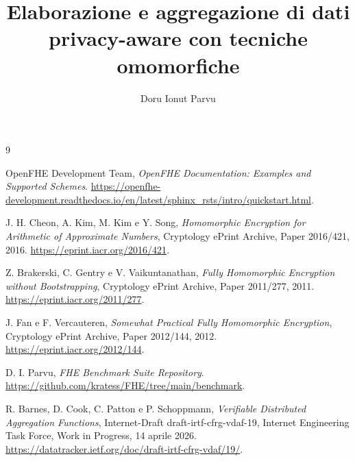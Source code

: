 \documentclass[12pt,a4paper]{report}
\title{Elaborazione e aggregazione di dati privacy-aware con tecniche omomorfiche}
\author{Doru Ionut Parvu}
\date{}
\begin{document}
\pagestyle{plain}
\justifying
\hypersetup{pageanchor=false}

\clearpage
\hypersetup{pageanchor=true}
\tableofcontents
\clearpage
{}








\begin{thebibliography}{9}

OpenFHE Development Team,
\emph{OpenFHE Documentation: Examples and Supported Schemes}.
\url{https://openfhe-development.readthedocs.io/en/latest/sphinx_rsts/intro/quickstart.html}.

J. H. Cheon, A. Kim, M. Kim e Y. Song,
\emph{Homomorphic Encryption for Arithmetic of Approximate Numbers},
Cryptology ePrint Archive, Paper 2016/421, 2016.
\url{https://eprint.iacr.org/2016/421}.

Z. Brakerski, C. Gentry e V. Vaikuntanathan,
\emph{Fully Homomorphic Encryption without Bootstrapping},
Cryptology ePrint Archive, Paper 2011/277, 2011.
\url{https://eprint.iacr.org/2011/277}.

J. Fan e F. Vercauteren,
\emph{Somewhat Practical Fully Homomorphic Encryption},
Cryptology ePrint Archive, Paper 2012/144, 2012.
\url{https://eprint.iacr.org/2012/144}.

D. I. Parvu,
\emph{FHE Benchmark Suite Repository}.
\url{https://github.com/kratess/FHE/tree/main/benchmark}.

R. Barnes, D. Cook, C. Patton e P. Schoppmann,
\emph{Verifiable Distributed Aggregation Functions},
Internet-Draft draft-irtf-cfrg-vdaf-19, Internet Engineering Task Force, Work in Progress, 14 aprile 2026.
\url{https://datatracker.ietf.org/doc/draft-irtf-cfrg-vdaf/19/}.

\end{thebibliography}
\end{document}
